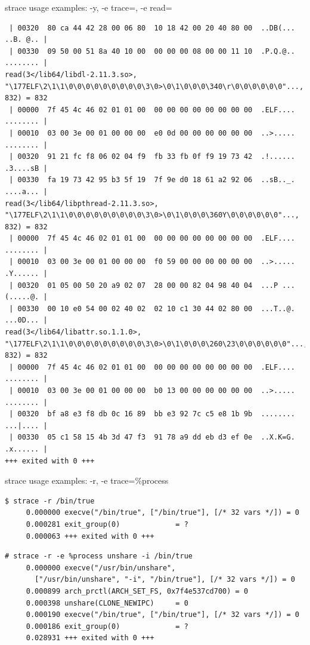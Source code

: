 \documentclass[unicode,aspectratio=169]{beamer}
\begin{document}
\begin{frame}[fragile]{strace usage examples: -y, -e trace=, -e read=}
\begin{verbatim}
 | 00320  80 ca 44 42 28 00 06 80  10 18 42 00 20 40 80 00  ..DB(... ..B. @.. |
 | 00330  09 50 00 51 8a 40 10 00  00 00 00 08 00 00 11 10  .P.Q.@.. ........ |
read(3</lib64/libdl-2.11.3.so>, "\177ELF\2\1\1\0\0\0\0\0\0\0\0\0\3\0>\0\1\0\0\0\340\r\0\0\0\0\0\0"..., 832) = 832
 | 00000  7f 45 4c 46 02 01 01 00  00 00 00 00 00 00 00 00  .ELF.... ........ |
 | 00010  03 00 3e 00 01 00 00 00  e0 0d 00 00 00 00 00 00  ..>..... ........ |
 | 00320  91 21 fc f8 06 02 04 f9  fb 33 fb 0f f9 19 73 42  .!...... .3....sB |
 | 00330  fa 19 73 42 95 b3 5f 19  7f 9e d0 18 61 a2 92 06  ..sB.._. ....a... |
read(3</lib64/libpthread-2.11.3.so>, "\177ELF\2\1\1\0\0\0\0\0\0\0\0\0\3\0>\0\1\0\0\0\360Y\0\0\0\0\0\0"..., 832) = 832
 | 00000  7f 45 4c 46 02 01 01 00  00 00 00 00 00 00 00 00  .ELF.... ........ |
 | 00010  03 00 3e 00 01 00 00 00  f0 59 00 00 00 00 00 00  ..>..... .Y...... |
 | 00320  01 05 00 50 20 a9 02 07  28 00 00 82 04 98 40 04  ...P ... (.....@. |
 | 00330  00 10 e0 54 00 02 40 02  02 10 c1 30 44 02 80 00  ...T..@. ...0D... |
read(3</lib64/libattr.so.1.1.0>, "\177ELF\2\1\1\0\0\0\0\0\0\0\0\0\3\0>\0\1\0\0\0\260\23\0\0\0\0\0\0"..., 832) = 832
 | 00000  7f 45 4c 46 02 01 01 00  00 00 00 00 00 00 00 00  .ELF.... ........ |
 | 00010  03 00 3e 00 01 00 00 00  b0 13 00 00 00 00 00 00  ..>..... ........ |
 | 00320  bf a8 e3 f8 db 0c 16 89  bb e3 92 7c c5 e8 1b 9b  ........ ...|.... |
 | 00330  05 c1 58 15 4b 3d 47 f3  91 78 a9 dd eb d3 ef 0e  ..X.K=G. .x...... |
+++ exited with 0 +++
\end{verbatim}
\end{frame}

\begin{frame}[fragile]{strace usage examples: -r, -e trace=\%process}
\scriptsize
\begin{verbatim}
$ strace -r /bin/true
     0.000000 execve("/bin/true", ["/bin/true"], [/* 32 vars */]) = 0
     0.000281 exit_group(0)             = ?
     0.000063 +++ exited with 0 +++
\end{verbatim}

\begin{verbatim}
# strace -r -e %process unshare -i /bin/true
     0.000000 execve("/usr/bin/unshare",
       ["/usr/bin/unshare", "-i", "/bin/true"], [/* 32 vars */]) = 0
     0.000899 arch_prctl(ARCH_SET_FS, 0x7f4e537cd700) = 0
     0.000398 unshare(CLONE_NEWIPC)     = 0
     0.000190 execve("/bin/true", ["/bin/true"], [/* 32 vars */]) = 0
     0.000186 exit_group(0)             = ?
     0.028931 +++ exited with 0 +++
\end{verbatim}
\end{frame}
\end{document}
